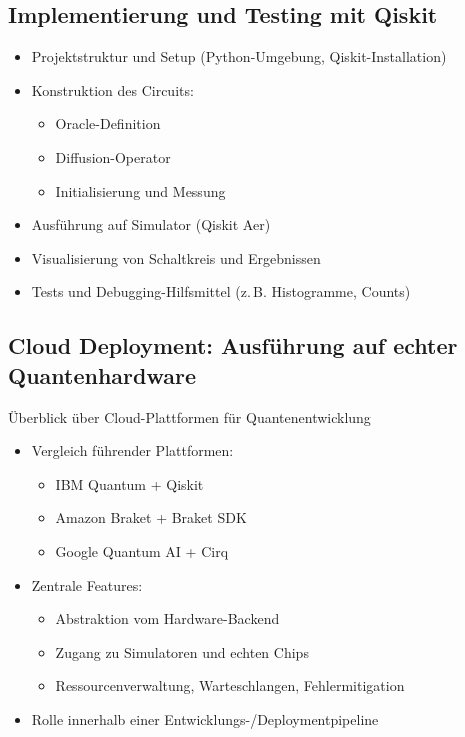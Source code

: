 \subsection{Implementierung und Testing mit Qiskit}
\begin{itemize}
    \item Projektstruktur und Setup (Python-Umgebung, Qiskit-Installation)
    \item Konstruktion des Circuits:
    \begin{itemize}
        \item Oracle-Definition
        \item Diffusion-Operator
        \item Initialisierung und Messung
    \end{itemize}
    \item Ausführung auf Simulator (Qiskit Aer)
    \item Visualisierung von Schaltkreis und Ergebnissen
    \item Tests und Debugging-Hilfsmittel (z.\,B. Histogramme, Counts)
\end{itemize}

\subsection{Cloud Deployment: Ausführung auf echter Quantenhardware}

Überblick über Cloud-Plattformen für Quantenentwicklung

\begin{itemize}
    \item Vergleich führender Plattformen:
    \begin{itemize}
        \item IBM Quantum + Qiskit
        \item Amazon Braket + Braket SDK
        \item Google Quantum AI + Cirq
    \end{itemize}
    \item Zentrale Features:
    \begin{itemize}
        \item Abstraktion vom Hardware-Backend
        \item Zugang zu Simulatoren und echten Chips
        \item Ressourcenverwaltung, Warteschlangen, Fehlermitigation
    \end{itemize}
    \item Rolle innerhalb einer Entwicklungs-/Deploymentpipeline
\end{itemize}

